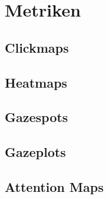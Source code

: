 %
%
%
%

\section{Metriken}


\subsection{Clickmaps}
\subsection{Heatmaps}
\subsection{Gazespots}
\subsection{Gazeplots}
\subsection{Attention Maps}